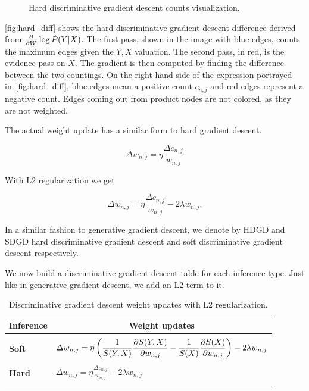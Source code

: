 \begin{figure}[h]
\begin{minipage}{0.3\textwidth}
    \caption*{$\nabla\log\tilde{P}(Y|X)$}
  \end{minipage}
  \caption{Hard discriminative gradient descent counts visualization.\label{fig:hard_diff}}
\end{figure}

\autoref{fig:hard_diff} shows the hard discriminative gradient descent difference derived from
$\frac{\partial}{\partial W}\log\tilde{P}(Y|X)$. The first pass, shown in the image with blue edges, counts the
maximum edges given the $Y,X$ valuation. The second pass, in red, is the evidence pass on $X$. The
gradient is then computed by finding the difference between the two countings. On the right-hand
side of the expression portrayed in~\autoref{fig:hard_diff}, blue edges mean a positive count
$c_{n,j}$ and red edges represent a negative count. Edges coming out from product nodes are not
colored, as they are not weighted.

The actual weight update has a similar form to hard gradient descent.

\begin{equation*}
  \Delta w_{n,j}=\eta\frac{\Delta c_{n,j}}{w_{n,j}}
\end{equation*}

With L2 regularization we get

\begin{equation}
  \Delta w_{n,j}=\eta\frac{\Delta c_{n,j}}{w_{n,j}}-2\lambda w_{n,j}.
\end{equation}

In a similar fashion to generative gradient descent, we denote by HDGD and SDGD hard discriminative
gradient descent and soft discriminative gradient descent respectively.

We now build a discriminative gradient descent table for each inference type. Just like in
generative gradient descent, we add an L2 term to it.

\begin{table}[h]
  \centering
  \begin{tabular}{l|l}
    \hline
    \multicolumn{1}{c}{\bfseries Inference} & \multicolumn{1}{c}{\bfseries Weight updates}\\
    \hline & \\
    \textbf{Soft} & \(\displaystyle \Delta
      w_{n,j}=\eta\left(\frac{1}{S(Y,X)}\frac{\partial S(Y,X)}{\partial w_{n,j}}-\frac{1}{S(X)}
        \frac{\partial S(X)}{\partial w_{n,j}}\right)-2\lambda w_{n,j} \) \\
    & \\
    \textbf{Hard} & \(\displaystyle \Delta w_{n,j}=\eta\frac{\Delta c_{n,j}}{w_{n,j}}-2\lambda w_{n,j} \) \\
    & \\
    \hline
  \end{tabular}
  \caption{Discriminative gradient descent weight updates with L2
    regularization.\label{tab:discriminative_weight_updates}}
\end{table}

